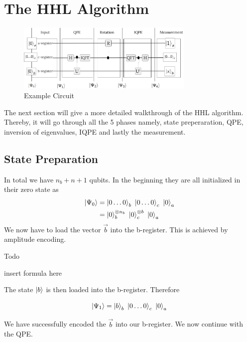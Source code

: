 \section{The HHL Algorithm}

\begin{figure}
    \centering
    \includegraphics[width=8.5cm]{img/example_circuit_cropped.png}
    \caption{Example Circuit}
    \label{ex_circ}
\end{figure}

The next section will give a more detailed walkthrough of the HHL algorithm.
Thereby, it will go through all the 5 phases namely, state preperaration, QPE, inversion of eigenvalues, IQPE and lastly the measurement.

\subsection{State Preparation}

In total we have $n_b + n + 1$ qubits. 
In the beginning they are all initialized in their zero state as
\begin{equation}
\begin{split}
\ket{\Psi_0} &= \ket{0\dots0}_b\ \ket{0\dots0}_c\ \ket{0}_a \\
&= \ket{0}_b^{{\otimes n_b}}\ \ket{0}_c^{\otimes b}\ \ket{0}_a 
\end{split}
\end{equation}
We now have to load the vector $\vec{b}$ into the b-register. 
This is achieved by amplitude encoding. 

Todo 

insert formula here

The state $\ket b$ is then loaded into the b-register. Therefore

\begin{equation}
\ket{\Psi_1} = \ket{b}_b\ \ket{0\dots0}_c\ \ket{0}_a
\end{equation}

We have successfully encoded the $\vec{b}$ into our b-register. 
We now continue with the QPE. 


